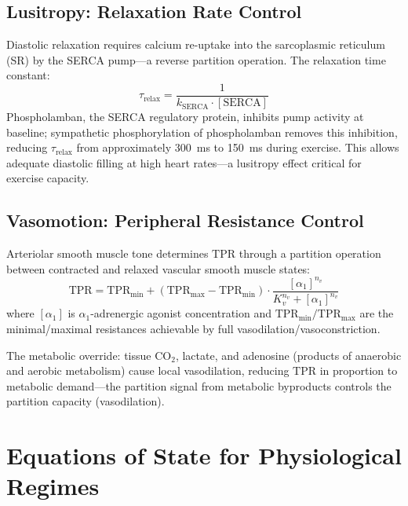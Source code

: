 \documentclass[12pt,a4paper]{article}
\theoremstyle{remark}
\newcommand{\TPR}{\mathrm{TPR}}
\begin{document}
\subsection{Lusitropy: Relaxation Rate Control}

Diastolic relaxation requires calcium re-uptake into the sarcoplasmic reticulum (SR) by the SERCA pump—a reverse partition operation. The relaxation time constant:
\begin{equation}
    \tau_{\mathrm{relax}} = \frac{1}{k_{\mathrm{SERCA}} \cdot [\mathrm{SERCA}]}
    \label{eq:lusitropy}
\end{equation}
Phospholamban, the SERCA regulatory protein, inhibits pump activity at baseline; sympathetic phosphorylation of phospholamban removes this inhibition, reducing $\tau_{\mathrm{relax}}$ from approximately 300~ms to 150~ms during exercise. This allows adequate diastolic filling at high heart rates—a lusitropy effect critical for exercise capacity.

\subsection{Vasomotion: Peripheral Resistance Control}

Arteriolar smooth muscle tone determines $\TPR$ through a partition operation between contracted and relaxed vascular smooth muscle states:
\begin{equation}
    \TPR = \TPR_{\mathrm{min}} + (\TPR_{\mathrm{max}} - \TPR_{\mathrm{min}}) \cdot \frac{[\alpha_1]^{n_v}}{K_v^{n_v} + [\alpha_1]^{n_v}}
    \label{eq:vasomotion}
\end{equation}
where $[\alpha_1]$ is $\alpha_1$-adrenergic agonist concentration and $\TPR_{\mathrm{min}}/\TPR_{\mathrm{max}}$ are the minimal/maximal resistances achievable by full vasodilation/vasoconstriction.

The metabolic override: tissue $\mathrm{CO}_2$, lactate, and adenosine (products of anaerobic and aerobic metabolism) cause local vasodilation, reducing $\TPR$ in proportion to metabolic demand—the partition signal from metabolic byproducts controls the partition capacity (vasodilation).

\section{Equations of State for Physiological Regimes}
\label{sec:eos}
\end{document}
